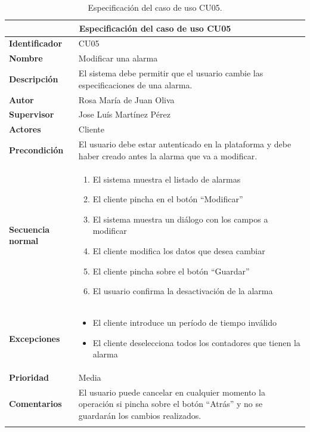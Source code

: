 \documentclass[pdftex,11pt,a4paper]{book}
\begin{document}

\renewcommand{\tablename}{Tabla}
\renewcommand{\arraystretch}{1,7}

\begin{center}
\begin{longtable}{|m{}|m{11cm}|}
\hline
\multicolumn{2}{|c|}{\textbf{Especificación del caso de uso CU05}}\\
\hline 
\endhead

\textbf{Identificador} & CU05  
\\ \hline
\textbf{Nombre} & Modificar una alarma  
\\ \hline
\textbf{Descripción} & El sistema debe permitir que el usuario cambie las especificaciones de una alarma.
\\ \hline
\textbf{Autor} & Rosa María de Juan Oliva 
\\ \hline
\textbf{Supervisor} & Jose Luís Martínez Pérez  
\\ \hline
\textbf{Actores} & Cliente
\\ \hline
\textbf{Precondición} & El usuario debe estar autenticado en la plataforma y debe haber creado antes la alarma que va a modificar.
\\ \hline
\textbf{Secuencia normal} & 
\begin{enumerate}
\addtolength{\itemsep}{-3mm}
\item El sistema muestra el listado de alarmas
\item El cliente pincha en el botón “Modificar”
\item El sistema muestra un diálogo con los campos a modificar
\item El cliente modifica los datos que desea cambiar
\item El cliente pincha sobre el botón “Guardar”
\item El usuario confirma la desactivación de la alarma
\end{enumerate}
\\ \hline
\textbf{Excepciones} &
\begin{itemize}
\addtolength{\itemsep}{-3mm}
\item El cliente introduce un período de tiempo inválido
\item El cliente deselecciona todos los contadores que tienen la alarma
\end{itemize}
\\ \hline
\textbf{Prioridad} & Media
\\ \hline
\textbf{Comentarios} & El usuario puede cancelar en cualquier momento la operación si pincha sobre el botón “Atrás” y no se guardarán los cambios realizados. 
\\ \hline

\caption{Especificación del caso de uso CU05.} \label{tablalarga:tablaCU05}
\end{longtable}
\end{center}
\end{document}
